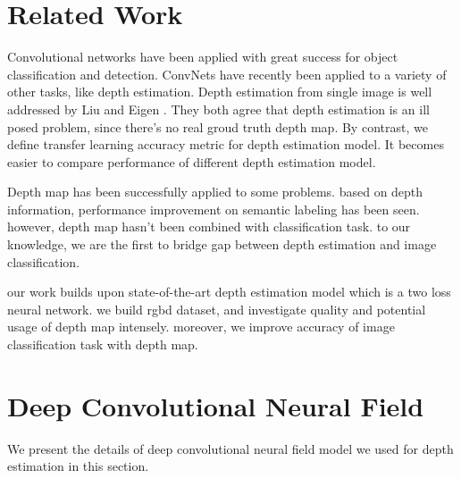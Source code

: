 \documentclass[10pt,twocolumn,letterpaper]{article}
\begin{document}
\section{Related Work}
Convolutional networks have been applied with great success for object 
classification and detection. ConvNets have recently been applied to a variety 
of other tasks, like depth estimation. Depth estimation from single image is 
well addressed by Liu\etal\cite{liu2015deep} and Eigen\etal 
\cite{eigen2015predicting}. They both agree that depth estimation 
is an ill posed problem, since there's no real groud truth depth map. By 
contrast, we define transfer learning accuracy metric for depth estimation 
model. It becomes easier to compare performance of different depth estimation 
model.

Depth map has been successfully applied to some problems. based on depth 
information, performance improvement on semantic 
labeling\cite{eigen2015predicting} has been seen. however, depth map hasn't 
been combined with classification task. to our knowledge, we are the first to 
bridge gap between depth estimation and image classification.

our work builds upon state-of-the-art depth estimation model\cite{liu2015deep}
which is a two loss neural network. we build rgbd dataset, and investigate 
quality and potential usage of depth map intensely. moreover, we improve 
accuracy of image classification task with depth map.

\section{Deep Convolutional Neural Field}
We present the details of deep convolutional neural field model we used for 
depth estimation in this section. 
\end{document}
